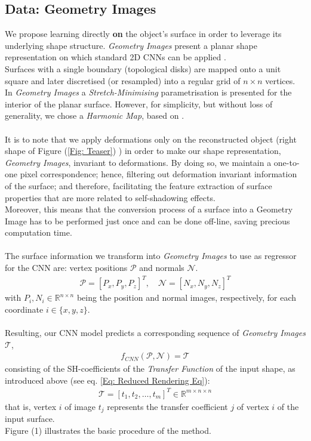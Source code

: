 \subsection{Data: Geometry Images}
We propose learning directly \textbf{on} the object's surface in order to leverage its underlying shape structure. \textit{Geometry Images} present a planar shape representation on which standard 2D CNNs can be applied \cite{gu2002geometry, sinha2016deep}. 
\\ 
Surfaces with a single boundary (topological disks) are mapped onto a unit square and later discretised (or resampled) into a regular grid of $n \times n$ vertices. \\
In \textit{Geometry Images} a \textit{Stretch-Minimising} parametrisation is presented for the interior of the planar surface. However, for simplicity, but without loss of generality, we  chose a \textit{Harmonic Map}, based on \cite{HM_book, HarmonicMapping}. \\
\\
It is to note that we apply deformations only on the reconstructed object (right shape of Figure (\ref{Fig: Teaser}) ) in order to make our shape representation, \textit{Geometry Images}, invariant to deformations. By doing so, we maintain a one-to-one pixel correspondence; hence, filtering out deformation invariant information of the surface; and therefore, facilitating the feature extraction of surface properties that are more related to self-shadowing effects. 
\\
Moreover, this means that the conversion process of a surface into a Geometry Image has to be performed just once and can be done off-line, saving precious computation time.\\
\\
The surface information we transform into \textit{Geometry Images} to use as regressor for the CNN are: vertex positions $\mathcal{P}$ and normals $\mathcal{N}$. 
\begin{align*}
	\mathcal{P} = [ P_x, P_y, P_z ]^T , \quad
	\mathcal{N} = [ N_x, N_y, N_z ] ^T 
\end{align*}
with  $P_i, N_i \in \mathbb{R}^{n \times n }$ being the position and normal images, respectively, for each coordinate $i \in \{ x,y,z\}$.
\\
\\
Resulting, our CNN model predicts a corresponding sequence of \textit{Geometry Images} $\mathcal{T}$,
\begin{align*}
	f_{CNN} (  \mathcal{P} , \mathcal{N} ) = \mathcal{T} 
\end{align*}
consisting of the SH-coefficients of the \textit{Transfer Function} of the input shape, as introduced above (see eq. \ref{Eq: Reduced Rendering Eq}):
\begin{align*}
	\mathcal{T} = [ t_1, t_2, \dots, t_m ]^T \in \mathbb{R}^{m \times n \times n} 
\end{align*}
that is, vertex $i$ of image $t_j$ represents the transfer coefficient $j$ of vertex $i$ of the input surface.
\\
Figure (1) illustrates the basic procedure of the method.

